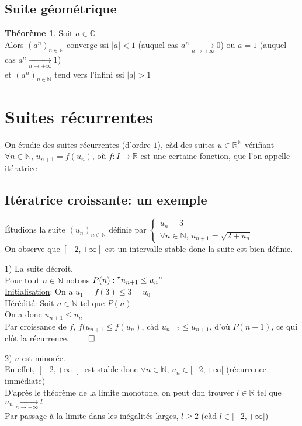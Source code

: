 \documentclass[10pt,a4paper]{article}
\theoremstyle{definition}
\newtheorem{theorem}[proposition]{Théorème}
\begin{document}
\subsection{Suite géométrique}
\begin{theorem}
Soit $a \in \mathbb{C}$ \\
Alors $(a^n)_{n \in \mathbb{N}}$ converge ssi $|a| < 1$ (auquel cas $a^n \xrightarrow[n \to +\infty]{} 0$) ou $a = 1$ (auquel cas $a^n \xrightarrow[n \to +\infty]{} 1$) \\
et $(a^n)_{n \in \mathbb{N}}$ tend vers l'infini ssi $|a| > 1$
\end{theorem}

\pagebreak

\section{Suites récurrentes}
On étudie des suites récurrentes (d'ordre $1$), càd des suites $u \in \mathbb{R}^\mathbb{N}$ vérifiant $\forall n \in \mathbb{N}$, $u_{n + 1} = f(u_n)$, où $f: I \to \mathbb{R}$ est une certaine fonction, que l'on appelle \uline{itératrice}

\subsection{Itératrice croissante: un exemple}
\noindent Étudions la suite $(u_n)_{n \in \mathbb{N}}$ définie par $\begin{cases}
u_n = 3 \\ \forall n \in \mathbb{N},\, u_{n + 1} = \sqrt{2 + u_n}
\end{cases}$ \\
On observe que $\left[-2, +\infty\right]$ est un intervalle stable donc la suite est bien définie. \medskip

1) La suite décroit.\\
Pour tout $n \in \mathbb{N}$ notons $P(n): "n_{n + 1} \leq u_n"$ \\
\uline{Initialisation}: On a $u_1 = f(3) \leq 3 = u_0$ \\
\uline{Hérédité}: Soit $n \in \mathbb{N}$ tel que $P(n)$ \\
On a donc $u_{n + 1} \leq u_n$ \\
Par croissance de $f$, $f(u_{n + 1} \leq f(u_n)$, càd $u_{n + 2} \leq u_{n + 1}$, d'où $P(n + 1)$, ce qui clôt la récurrence. $\qed$ \medskip

2) $u$ est minorée. \\
En effet, $\left[-2, +\infty\right[$ est stable donc $\forall n \in \mathbb{N}$, $u_n \in [-2, +\infty[$ (récurrence immédiate) \\
D'après le théorème de la limite monotone, on peut don trouver $l \in \mathbb{R}$ tel que $u_n \xrightarrow[ n \to +\infty]{} l$ \\
Par passage à la limite dans les inégalités larges, $l \geq 2$ (càd $l \in [-2, +\infty[$) \medskip
\end{document}
